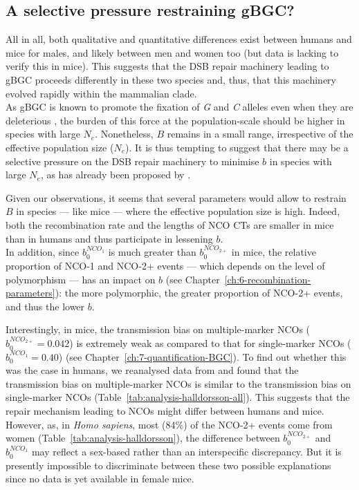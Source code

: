 \subsection{A selective pressure restraining gBGC?}

All in all, both qualitative and quantitative differences exist between humans and mice for males, and likely between men and women too (but data is lacking to verify this in mice).
This suggests that the DSB repair machinery leading to gBGC proceeds differently in these two species and, thus, that this machinery evolved rapidly within the mammalian clade.\\

As gBGC is known to promote the fixation of \textit{G} and \textit{C} alleles even when they are deleterious \citep{galtier2009gcbiased, necsulea2011meiotic}, the burden of this force at the population-scale should be higher in species with large $N_e$. Nonetheless, $B$ remains in a small range, irrespective of the effective population size ($N_e$). It is thus tempting to suggest that there may be a selective pressure on the DSB repair machinery to minimise $b$ in species with large $N_e$, as has already been proposed by \citet{galtier2018codon}.

Given our observations, it seems that several parameters would allow to restrain $B$ in species — like mice — where the effective population size is high.
Indeed, both the recombination rate and the lengths of NCO CTs are smaller in mice than in humans and thus participate in lessening $b$.\\

In addition, since $b_0^{NCO_1}$ is much greater than $b_0^{NCO_{2+}}$ in mice, the relative proportion of NCO-1 and NCO-2+ events — which depends on the level of polymorphism — has an impact on $b$ (see Chapter~\ref{ch:6-recombination-parameters}): the more polymorphic, the greater proportion of NCO-2+ events, and thus the lower $b$. 

Interestingly, in mice, the transmission bias on multiple-marker NCOs ($b_0^{NCO_{2+}} = 0.042$) is extremely weak as compared to that for single-marker NCOs ($b_0^{NCO_{1}} = 0.40$) (see Chapter~\ref{ch:7-quantification-BGC}).
To find out whether this was the case in humans, we reanalysed data from \citet{halldorsson2016rate} and found that the transmission bias on multiple-marker NCOs is similar to the transmission bias on single-marker NCOs (Table~\ref{tab:analysis-halldorsson-all}).
This suggests that the repair mechanism leading to NCOs might differ between humans and mice.
However, as, in \textit{Homo sapiens}, most (84\%) of the NCO-2+ events come from women (Table~\ref{tab:analysis-halldorsson}), the difference between $b_0^{NCO_{2+}}$ and $b_0^{NCO_{1}}$ may reflect a sex-based rather than an interspecific discrepancy.
But it is presently impossible to discriminate between these two possible explanations since no data is yet available in female mice.

